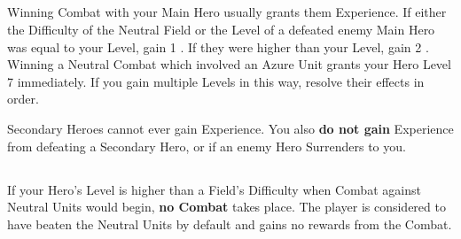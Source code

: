 \begin{multicols}{2}
\subsection*{}

Winning Combat with your Main Hero usually grants them Experience.
If either the Difficulty of the Neutral Field or the Level of a defeated enemy Main Hero was equal to your Level, gain 1 .
If they were higher than your Level, gain 2 .
Winning a Neutral Combat which involved an Azure  Unit grants your Hero Level 7 immediately.
If you gain multiple Levels in this way, resolve their effects in order.\par
Secondary Heroes cannot ever gain Experience.
You also \textbf{do not gain} Experience from defeating a Secondary Hero, or if an enemy Hero Surrenders to you.
\subsection*{}
If your Hero's Level is higher than a Field's Difficulty when Combat against Neutral Units would begin, \textbf{no Combat} takes place.
The player is considered to have beaten the Neutral Units by default and gains no rewards from the Combat.


\end{multicols}
